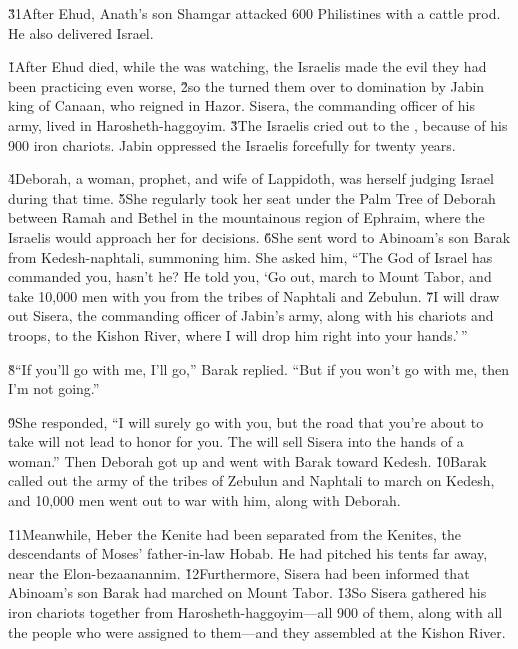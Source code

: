 \v{31}After Ehud, Anath's son Shamgar attacked 600 Philistines with a cattle prod. He also delivered Israel.

\v{1}After Ehud died, while the  was watching, the Israelis made the evil they had been practicing even worse, \v{2}so the  turned them over to domination by Jabin king of Canaan, who reigned in Hazor. Sisera, the commanding officer of his army, lived in Harosheth-haggoyim. \v{3}The Israelis cried out to the , because of his 900 iron chariots. Jabin oppressed the Israelis forcefully for twenty years.

\v{4}Deborah, a woman, prophet, and wife of Lappidoth, was herself judging Israel during that time. \v{5}She regularly took her seat under the Palm Tree of Deborah between Ramah and Bethel in the mountainous region of Ephraim, where the Israelis would approach her for decisions. \v{6}She sent word to Abinoam's son Barak from Kedesh-naphtali, summoning him. She asked him, ``The  God of Israel has commanded you, hasn't he? He told you, `Go out, march to Mount Tabor, and take 10,000 men with you from the tribes of Naphtali and Zebulun. \v{7}I will draw out Sisera, the commanding officer of Jabin's army, along with his chariots and troops, to the Kishon River, where I will drop him right into your hands.'\,''

\v{8}``If you'll go with me, I'll go,'' Barak replied. ``But if you won't go with me, then I'm not going.''

\v{9}She responded, ``I will surely go with you, but the road that you're about to take will not lead to honor for you. The  will sell Sisera into the hands of a woman.'' Then Deborah got up and went with Barak toward Kedesh. \v{10}Barak called out the army of the tribes of Zebulun and Naphtali to march on Kedesh, and 10,000 men went out to war with him, along with Deborah.

\v{11}Meanwhile, Heber the Kenite had been separated from the Kenites, the descendants of Moses' father-in-law Hobab. He had pitched his tents far away, near the Elon-bezaanannim. \v{12}Furthermore, Sisera had been informed that Abinoam's son Barak had marched on Mount Tabor. \v{13}So Sisera gathered his iron chariots together from Harosheth-haggoyim---all 900 of them, along with all the people who were assigned to them---and they assembled at the Kishon River.

